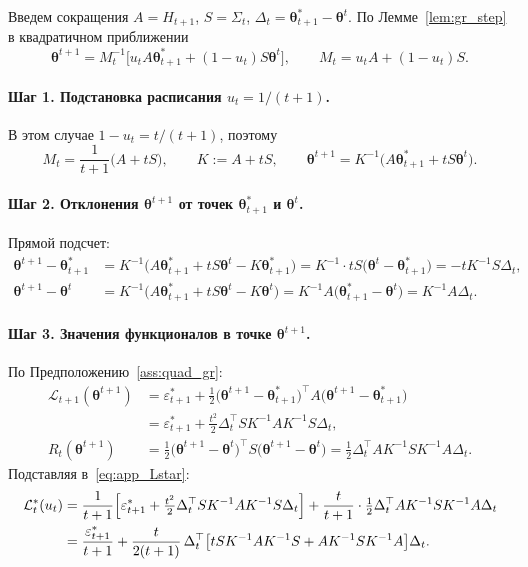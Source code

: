 \documentclass[a4paper,14pt,oneside,openany]{extarticle}
\newcommand{\cL}{\mathcal{L}}
\newcommand{\btheta}{\boldsymbol{\theta}}
\begin{document}
Введем сокращения $A = H_{t+1}$, $S = \Sigma_t$, $\Delta_t = \btheta^*_{t+1} - \btheta^t$. По Лемме~\ref{lem:gr_step} в квадратичном приближении
\begin{equation}
    \btheta^{t+1} = M_t^{-1}\bigl[u_t A \btheta^*_{t+1} + (1 - u_t) S \btheta^t\bigr], \qquad M_t = u_t A + (1 - u_t) S.
    \label{eq:app_step}
\end{equation}

\paragraph{Шаг 1. Подстановка расписания $u_t = 1/(t+1)$.} В этом случае $1 - u_t = t/(t+1)$, поэтому
\[
    M_t = \frac{1}{t+1}\bigl(A + t S\bigr), \qquad K := A + t S, \qquad \btheta^{t+1} = K^{-1}\bigl(A \btheta^*_{t+1} + t S \btheta^t\bigr).
\]

\paragraph{Шаг 2. Отклонения $\btheta^{t+1}$ от точек $\btheta^*_{t+1}$ и $\btheta^t$.} Прямой подсчет:
\begin{align*}
    \btheta^{t+1} - \btheta^*_{t+1} &= K^{-1}\bigl(A \btheta^*_{t+1} + t S \btheta^t - K \btheta^*_{t+1}\bigr) = K^{-1}\cdot tS\bigl(\btheta^t - \btheta^*_{t+1}\bigr) = -t K^{-1} S \Delta_t, \\
    \btheta^{t+1} - \btheta^t &= K^{-1}\bigl(A \btheta^*_{t+1} + t S \btheta^t - K \btheta^t\bigr) = K^{-1} A \bigl(\btheta^*_{t+1} - \btheta^t\bigr) = K^{-1} A \Delta_t.
\end{align*}

\paragraph{Шаг 3. Значения функционалов в точке $\btheta^{t+1}$.} По Предположению~\ref{ass:quad_gr}:
\begin{align*}
    \cL_{t+1}(\btheta^{t+1}) &= \varepsilon^*_{t+1} + \tfrac{1}{2}\bigl(\btheta^{t+1} - \btheta^*_{t+1}\bigr)^\top A \bigl(\btheta^{t+1} - \btheta^*_{t+1}\bigr) \\
    &= \varepsilon^*_{t+1} + \tfrac{t^2}{2}\Delta_t^\top S K^{-1} A K^{-1} S \Delta_t, \\
    R_t(\btheta^{t+1}) &= \tfrac{1}{2}\bigl(\btheta^{t+1} - \btheta^t\bigr)^\top S \bigl(\btheta^{t+1} - \btheta^t\bigr) = \tfrac{1}{2}\Delta_t^\top A K^{-1} S K^{-1} A \Delta_t.
\end{align*}
Подставляя в~\eqref{eq:app_Lstar}:
\begin{align}
    \cL^*_t(u_t) &= \frac{1}{t+1}\Bigl[\varepsilon^*_{t+1} + \tfrac{t^2}{2}\Delta_t^\top S K^{-1} A K^{-1} S \Delta_t\Bigr] + \frac{t}{t+1}\cdot \tfrac{1}{2}\Delta_t^\top A K^{-1} S K^{-1} A \Delta_t \notag \\
    &= \frac{\varepsilon^*_{t+1}}{t+1} + \frac{t}{2(t+1)}\,\Delta_t^\top \bigl[t S K^{-1} A K^{-1} S + A K^{-1} S K^{-1} A\bigr]\Delta_t.
    \label{eq:app_Lstar_quad}
\end{align}
\end{document}
